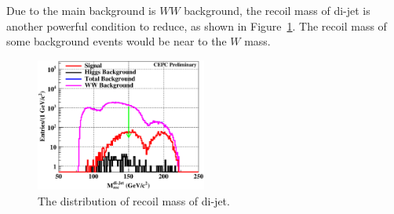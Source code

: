\documentclass[11pt,a4paper]{cepcnote}
\begin{document}
Due to the main background is $WW$ background, the recoil mass of di-jet is another powerful condition to reduce, 
as shown in Figure~\ref{fig:nnHuvqqrecojet}. The recoil mass of some background events would be near to the $W$ mass.
\begin{figure}[H]
	\centering
	\includegraphics[width=0.5\textwidth]{nnH/lvqq/uvqq/JetReco}
	\caption[]{The distribution of recoil mass of di-jet.}
	\label{fig:nnHuvqqrecojet}
\end{figure}
\end{document}
